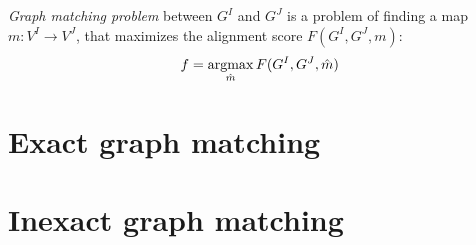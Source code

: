 \emph{Graph matching problem} between $G^I$ and $G^J$ is a problem of finding a map $m:V^I\rightarrow V^J$, that maximizes the alignment score $F(G^I, G^J, m)$:
\begin{equation} \label{gGMP}
f = \mathop{\rm argmax}_{\hat{m}}F(G^I, G^J, \hat{m})
\end{equation}
 
\section{Exact graph matching}

\section{Inexact graph matching}

